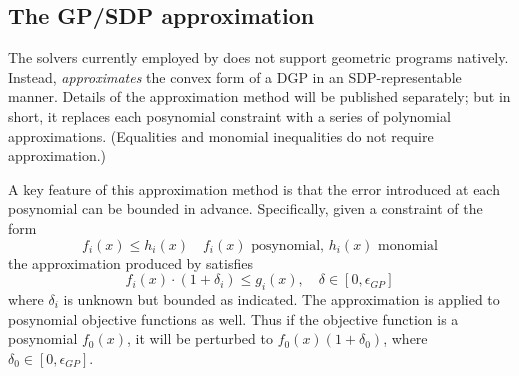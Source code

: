 \documentclass[12pt]{article}
\begin{document}

\iffalse
\subsection{The GP/SDP approximation}
\label{sec:gp-approx}

The solvers currently employed by \cvx does not support geometric programs natively.
Instead, \cvx \emph{approximates} the convex form of a DGP in an SDP-representable
manner. Details of the approximation method will be published separately; but in short,
it replaces each posynomial constraint with a series of polynomial
approximations. (Equalities and monomial inequalities do not require approximation.)

A key feature of this approximation method is that the error introduced at
each posynomial can be bounded in advance. Specifically,
given a constraint of the form
\begin{equation}
	\label{eq:constr-gp}
	f_i(x) \leq h_i(x) \quad f_i(x)\text{ posynomial, }h_i(x)\text{ monomial}
\end{equation}
the approximation produced by \cvx satisfies
\begin{equation}
	\label{eq:constr-approx}
	f_i(x) \cdot ( 1 + \delta_i ) \leq g_i(x), \quad \delta\in[0,\epsilon_{GP}]
\end{equation}
where $\delta_i$ is unknown but bounded as indicated.
The approximation is applied to posynomial objective functions as well. Thus
if the objective function is a posynomial $f_0(x)$, it will be perturbed to
$f_0(x)(1+\delta_0)$, where $\delta_0\in[0,\epsilon_{GP}]$. 
\end{document}
